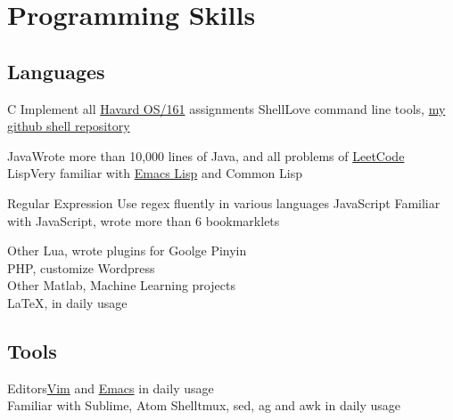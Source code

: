 

\section{Programming Skills}
\subsection{Languages}
\cvcomputer
{C}{
  Implement all \href{http://www.eecs.harvard.edu/~syrah/os161/}{Havard OS/161} assignments
}
{Shell}{Love command line tools, \href{https://github.com/xcv58/Shell_script}{my github shell repository}}

\cvcomputer
{Java}{Wrote more than 10,000 lines of Java, and all problems of \href{https://dl.dropboxusercontent.com/u/4121165/LeetCode/All-sort-by-ac.png}{LeetCode}}
{Lisp}{Very familiar with \href{https://github.com/xcv58/Emacs_config}{Emacs Lisp} and Common Lisp}

\cvcomputer
{Regular Expression}{
  Use regex fluently in various languages
}
{JavaScript}{
  Familiar with JavaScript, wrote more than 6 bookmarklets\\
}

\cvcomputer
{Other}{
  Lua, wrote plugins for Goolge Pinyin\\
  PHP, customize Wordpress\\
}
{Other}{
  Matlab, Machine Learning projects\\
  {\LaTeX}, in daily usage
}

\subsection{Tools}
\cvcomputer
{Editors}{\href{https://github.com/xcv58/Vim_config}{Vim} and \href{https://github.com/xcv58/Emacs_config}{Emacs} in daily usage\\
Familiar with Sublime, Atom}
{Shell}{tmux, sed, ag and awk in daily usage}
